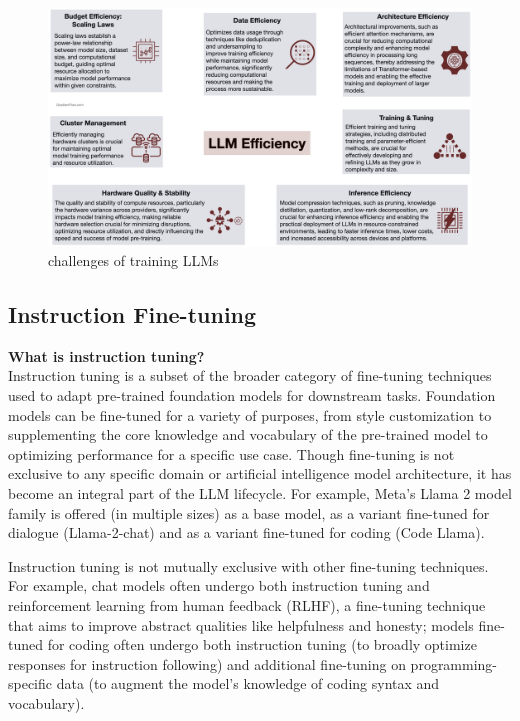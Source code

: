 \begin{figure}[h!]
	\centering
	\includegraphics[scale=0.2]{figures/llm computational resources.jpeg}
	\caption{challenges of training LLMs }
\end{figure}
\newpage

\subsection{Instruction Fine-tuning} 

\hfill \break
\textbf{What is instruction tuning?} \\

Instruction tuning is a subset of the broader category of fine-tuning techniques used to adapt pre-trained foundation models for downstream tasks. Foundation models can be fine-tuned for a variety of purposes, from style customization to supplementing the core knowledge and vocabulary of the pre-trained model to optimizing performance for a specific use case. Though fine-tuning is not exclusive to any specific domain or artificial intelligence model architecture, it has become an integral part of the LLM lifecycle. For example, Meta’s Llama 2 model family is offered (in multiple sizes) as a base model, as a variant fine-tuned for dialogue (Llama-2-chat) and as a variant fine-tuned for coding (Code Llama).

\hfill 

Instruction tuning is not mutually exclusive with other fine-tuning techniques. For example, chat models often undergo both instruction tuning and reinforcement learning from human feedback (RLHF), a fine-tuning technique that aims to improve abstract qualities like helpfulness and honesty; models fine-tuned for coding often undergo both instruction tuning (to broadly optimize responses for instruction following) and additional fine-tuning on programming-specific data (to augment the model’s knowledge of coding syntax and vocabulary).


